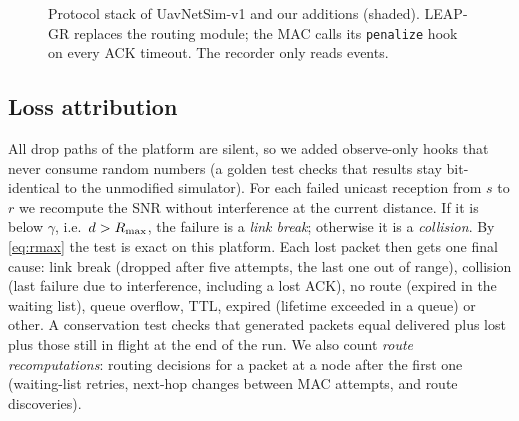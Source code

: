 \begin{figure}[t]
\centering
{}
\caption{Protocol stack of UavNetSim-v1 and our additions (shaded). LEAP-GR replaces the routing module;
the MAC calls its \texttt{penalize} hook on every ACK timeout. The recorder only reads events.}
\label{fig:arch}
\end{figure}

\subsection{Loss attribution}
\label{sec:attribution}

All drop paths of the platform are silent, so we added observe-only hooks that never consume random numbers
(a golden test checks that results stay bit-identical to the unmodified simulator). For each failed
unicast reception from $s$ to $r$ we recompute the SNR without interference at the current distance. If it is
below $\gamma$, i.e.\ $d>R_{\max}$, the failure is a \emph{link break}; otherwise it is a \emph{collision}. By
\eqref{eq:rmax} the test is exact on this platform. Each lost packet then gets one final cause: link break
(dropped after five attempts, the last one out of range), collision (last failure due to interference,
including a lost ACK), no route (expired in the waiting list), queue overflow, TTL, expired (lifetime exceeded
in a queue) or other. A conservation test checks that generated packets equal delivered plus lost plus those
still in flight at the end of the run. We also count \emph{route recomputations}: routing decisions for a
packet at a node after the first one (waiting-list retries, next-hop changes between MAC attempts, and route
discoveries).

